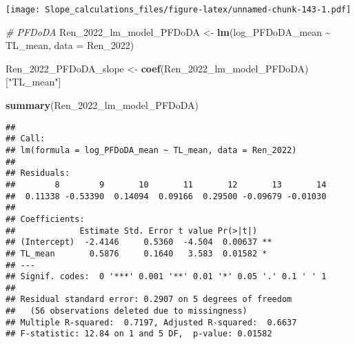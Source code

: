 \documentclass[
]{article}
\newenvironment{Shaded}{\begin{snugshade}}{\end{snugshade}}
\newcommand{\AttributeTok}[1]{\textcolor[rgb]{0.13,0.29,0.53}{#1}}
\newcommand{\CommentTok}[1]{\textcolor[rgb]{0.56,0.35,0.01}{\textit{#1}}}
\newcommand{\FunctionTok}[1]{\textcolor[rgb]{0.13,0.29,0.53}{\textbf{#1}}}
\newcommand{\NormalTok}[1]{#1}
\newcommand{\OtherTok}[1]{\textcolor[rgb]{0.56,0.35,0.01}{#1}}
\newcommand{\SpecialCharTok}[1]{\textcolor[rgb]{0.81,0.36,0.00}{\textbf{#1}}}
\newcommand{\StringTok}[1]{\textcolor[rgb]{0.31,0.60,0.02}{#1}}
\begin{document}
\texttt{[image: Slope\_calculations\_files/figure-latex/unnamed-chunk-143-1.pdf]}

\begin{Shaded}
\begin{Highlighting}[]
\CommentTok{\# PFDoDA}
\NormalTok{Ren\_2022\_lm\_model\_PFDoDA }\OtherTok{\textless{}{-}} \FunctionTok{lm}\NormalTok{(log\_PFDoDA\_mean }\SpecialCharTok{\textasciitilde{}}\NormalTok{ TL\_mean,}
                              \AttributeTok{data =}\NormalTok{ Ren\_2022)}

\NormalTok{Ren\_2022\_PFDoDA\_slope }\OtherTok{\textless{}{-}} \FunctionTok{coef}\NormalTok{(Ren\_2022\_lm\_model\_PFDoDA)[}\StringTok{"TL\_mean"}\NormalTok{]}

\FunctionTok{summary}\NormalTok{(Ren\_2022\_lm\_model\_PFDoDA)}
\end{Highlighting}
\end{Shaded}

\begin{verbatim}
## 
## Call:
## lm(formula = log_PFDoDA_mean ~ TL_mean, data = Ren_2022)
## 
## Residuals:
##        8        9       10       11       12       13       14 
##  0.11338 -0.53390  0.14094  0.09166  0.29500 -0.09679 -0.01030 
## 
## Coefficients:
##             Estimate Std. Error t value Pr(>|t|)   
## (Intercept)  -2.4146     0.5360  -4.504  0.00637 **
## TL_mean       0.5876     0.1640   3.583  0.01582 * 
## ---
## Signif. codes:  0 '***' 0.001 '**' 0.01 '*' 0.05 '.' 0.1 ' ' 1
## 
## Residual standard error: 0.2907 on 5 degrees of freedom
##   (56 observations deleted due to missingness)
## Multiple R-squared:  0.7197, Adjusted R-squared:  0.6637 
## F-statistic: 12.84 on 1 and 5 DF,  p-value: 0.01582
\end{verbatim}
\end{document}

